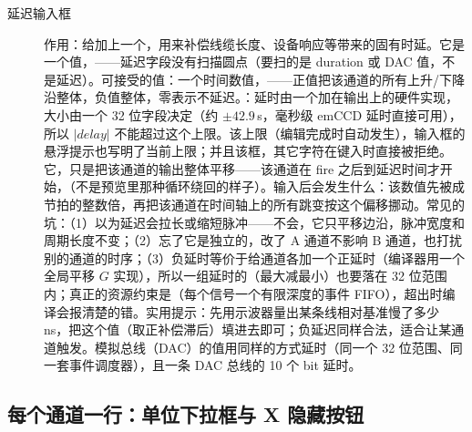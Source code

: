 \documentclass[11pt,oneside,openany]{book}
\begin{document}
\begin{description}
\item[延迟输入框] 作用：给加上一个，用来补偿线缆长度、设备响应等带来的固有时延。它是一个值，——延迟字段没有扫描圆点（要扫的是 duration 或 DAC 值，不是延迟）。可接受的值：一个时间数值，——正值把该通道的所有上升/下降沿整体，负值整体，零表示不延迟。：延时由一个加在输出上的硬件实现，大小由一个 32 位字段决定（约 $\pm42.9\,$s，毫秒级 emCCD 延时直接可用），所以 $|delay|$ 不能超过这个上限。该上限（编辑完成时自动发生），输入框的悬浮提示也写明了当前上限；并且该框，其它字符在键入时直接被拒绝。它，只是把该通道的输出整体平移——该通道在 fire 之后到延迟时间才开始，（不是预览里那种循环绕回的样子）。输入后会发生什么：该数值先被成节拍的整数倍，再把该通道在时间轴上的所有跳变按这个偏移挪动。常见的坑：（1）以为延迟会拉长或缩短脉冲——不会，它只平移边沿，脉冲宽度和周期长度不变；（2）忘了它是独立的，改了 A 通道不影响 B 通道，也打扰别的通道的时序；（3）负延时等价于给通道各加一个正延时（编译器用一个全局平移 $G$ 实现），所以一组延时的（最大减最小）也要落在 32 位范围内；真正的资源约束是（每个信号一个有限深度的事件 FIFO），超出时编译会报清楚的错。实用提示：先用示波器量出某条线相对基准慢了多少 ns，把这个值（取正补偿滞后）填进去即可；负延迟同样合法，适合让某通道触发。模拟总线（DAC）的值用同样的方式延时（同一个 32 位范围、同一套事件调度器），且一条 DAC 总线的 10 个 bit 延时。
\end{description}

\subsection{每个通道一行：单位下拉框与 X 隐藏按钮}
\end{document}
